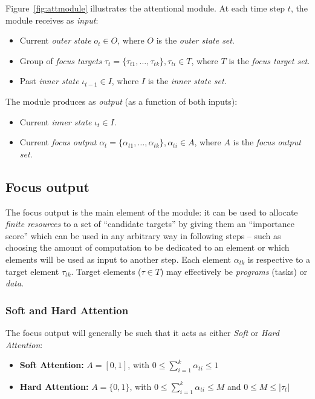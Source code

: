 \documentclass[11pt]{article}
\begin{document}
Figure~\ref{fig:attmodule} illustrates the attentional module. At each time step $t$, the module receives as \emph{input}:
\begin{itemize}
    \item Current \emph{outer state} $o_t \in O$, where $O$ is the \emph{outer state set}.
    \item Group of \emph{focus targets} $\tau_t = \{\tau_{t1}, \ldots, \tau_{tk}\}, \tau_{ti} \in T$,
        where $T$ is the \emph{focus target set}.
    \item Past \emph{inner state} $\iota_{t-1} \in I$, where $I$ is the \emph{inner state set}.
\end{itemize}

The module produces as \emph{output} (as a function of both inputs):
\begin{itemize}
    \item Current \emph{inner state} $\iota_t \in I$.
    \item Current \emph{focus output} $\alpha_t = \{\alpha_{t1}, \ldots, \alpha_{tk}\}, \alpha_{ti} \in A$,
        where $A$ is the \emph{focus output set}.
\end{itemize}

\subsection{Focus output}
The focus output is the main element of the module: it can be used to allocate \emph{finite resources} to a set of ``candidate targets'' by giving them an ``importance score'' which can be used in any arbitrary way in following steps -- such as choosing the amount of computation to be dedicated to an element or which elements will be used as input to another step.
Each element $\alpha_{tk}$ is respective to a target element $\tau_{tk}$.
Target elements ($\tau \in T$) may effectively be \emph{programs} (tasks) or \emph{data}.

\subsubsection{Soft and Hard Attention}
The focus output will generally be such that it acts as either \emph{Soft} or \emph{Hard Attention}:
\begin{itemize}
    \item \textbf{Soft Attention:}
        $A = [0, 1]$, with $0 \le \sum_{i=1}^{k} \alpha_{ti} \le 1$
    \item \textbf{Hard Attention:}
        $A = \{0, 1\}$, with $0 \le \sum_{i=1}^{k} \alpha_{ti} \le M$ and $0 \le M \le |\tau_t|$
\end{itemize}
\end{document}
